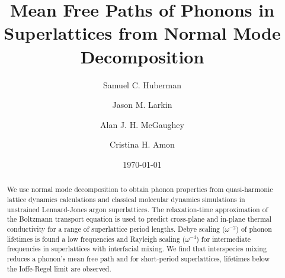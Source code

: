 \documentclass[aps,prb,preprint,preprintnumbers,amsmath,amssymb,floatfix,superscriptaddress]{revtex4}
\begin{document}
\title{Mean Free Paths of Phonons in Superlattices from Normal Mode Decomposition}
\author{Samuel C. Huberman}
\author{Jason M. Larkin}
\author{Alan J. H. McGaughey}
\author{Cristina H. Amon}

\date{\today}%
\vspace{14mm}
  
\begin{abstract}

We use normal mode decomposition to obtain phonon properties from quasi-harmonic lattice dynamics calculations and classical molecular dynamics simulations in unstrained Lennard-Jones argon superlattices. The relaxation-time approximation of the Boltzmann transport equation is used to predict cross-plane and in-plane thermal conductivity for a range of superlattice period lengths. Debye scaling ($\omega^{-2}$) of phonon lifetimes is found a low frequencies and Rayleigh scaling ($\omega^{-4}$) for intermediate frequencies in superlattices with interfacial mixing. We find that interspecies mixing reduces a phonon's mean free path and for short-period superlattices, lifetimes below the Ioffe-Regel limit are observed.

\end{abstract}
\maketitle
\end{document}
